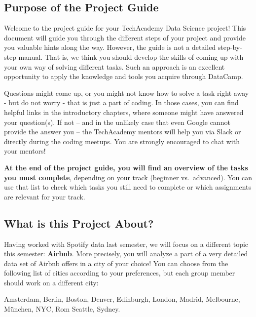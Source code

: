 \documentclass[
  11pt,
]{article}
\begin{document}
\hypertarget{purpose-of-the-project-guide}{%
\subsection{Purpose of the Project Guide}\label{purpose-of-the-project-guide}}

Welcome to the project guide for your TechAcademy Data Science project! This document will guide you through the different steps of your project and provide you valuable hints along the way. However, the guide is not a detailed step-by-step manual. That is, we think you should develop the skills of coming up with your own way of solving different tasks. Such an approach is an excellent opportunity to apply the knowledge and tools you acquire through DataCamp.

Questions might come up, or you might not know how to solve a task right away - but do not worry - that is just a part of coding. In those cases, you can find helpful links in the introductory chapters, where someone might have answered your question(s). If not -- and in the unlikely case that even Google cannot provide the answer you -- the TechAcademy mentors will help you via Slack or directly during the coding meetups. You are strongly encouraged to chat with your mentors!

\textbf{At the end of the project guide, you will find an overview of the tasks you must complete}, depending on your track (beginner vs.~advanced). You can use that list to check which tasks you still need to complete or which assignments are relevant for your track.

\hypertarget{what-is-this-project-about}{%
\subsection{What is this Project About?}\label{what-is-this-project-about}}

Having worked with Spotify data last semester, we will focus on a different topic this semester: \textbf{Airbnb}. More precisely, you will analyze a part of a very detailed data set of Airbnb offers in a city of your choice!
You can choose from the following list of cities according to your preferences, but each group member should work on a different city:

Amsterdam,
Berlin,
Boston,
Denver,
Edinburgh,
London,
Madrid,
Melbourne,
München,
NYC,
Rom
Seattle,
Sydney.
\end{document}
